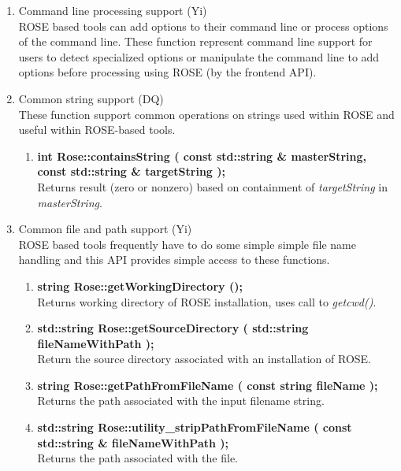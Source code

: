 \begin{enumerate}
   \item Command line processing support (Yi) \\
   ROSE based tools can add options to their command line or process options of the
   command line.  These function represent command line support for users to detect
   specialized options or manipulate the command line to add options before processing
   using ROSE (by the frontend API).

   \item Common string support (DQ) \\
         These function support common operations on strings used within ROSE and 
         useful within ROSE-based tools.
   \begin{enumerate}
      \item {\bf int Rose::containsString ( const std::string \& masterString, const std::string \& targetString );} \\
      Returns result (zero or nonzero) based on containment of {\em targetString} in {\em masterString}.
   \end{enumerate}

   \item Common file and path support (Yi) \\
   ROSE based tools frequently have to do some simple simple file name handling
   and this API provides simple access to these functions.
   \begin{enumerate}
      \item {\bf string Rose::getWorkingDirectory ();} \\
      Returns working directory of ROSE installation, uses call to {\em getcwd()}.

      \item {\bf std::string Rose::getSourceDirectory ( std::string fileNameWithPath );} \\
      Return the source directory associated with an installation of ROSE.

      \item {\bf string Rose::getPathFromFileName ( const string fileName );} \\
      Returns the path associated with the input filename string.

      \item {\bf std::string Rose::utility\_stripPathFromFileName ( const std::string \& fileNameWithPath );} \\
      Returns the path associated with the file.


\end{enumerate}
\end{enumerate}
